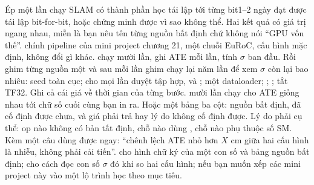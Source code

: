 \documentclass[../../deep_learning.tex]{subfiles}
\begin{document}
\begin{ungdung}
\end{ungdung}

\begin{duan}{Ép một lần chạy SLAM có thành phần học tái lập tới từng bit}{1--2 ngày}
\dmt đạt được tái lập bit-for-bit, hoặc chứng minh được vì sao không thể. Hai kết quả có giá trị ngang nhau, miễn là bạn nêu tên từng nguồn bất định chứ không nói ``GPU vốn thế''.
\ddl chính pipeline của mini project chương 21, một chuỗi EuRoC, cấu hình mặc định, không đổi gì khác.
\dbc chạy mười lần, ghi ATE mỗi lần, tính $\sigma$ ban đầu. Rồi ghim từng nguồn một và sau mỗi lần ghim chạy lại năm lần để xem $\sigma$ còn lại bao nhiêu: seed toàn cục;  cho mọi lần duyệt tập hợp,  và ; một  dataloader; ; ; tắt TF32. Ghi cả cái giá về thời gian của từng bước.
\dxk mười lần chạy cho ATE giống nhau tới chữ số cuối cùng bạn in ra. Hoặc một bảng ba cột: nguồn bất định, đã cố định được chưa, và giá phải trả hay lý do không cố định được. Lý do phải cụ thể: op nào không có bản tất định, chỗ nào dùng , chỗ nào phụ thuộc số SM. Kèm một câu dùng được ngay: ``chênh lệch ATE nhỏ hơn $X$ cm giữa hai cấu hình là nhiễu, không phải cải tiến''.
\dnv {} cho hình chữ ký của một con số và bảng nguồn bất định;  cho cách đọc con số $\sigma$ đó khi so hai cấu hình;  nếu bạn muốn xếp các mini project này vào một lộ trình học theo mục tiêu.
\end{duan}
\end{document}
